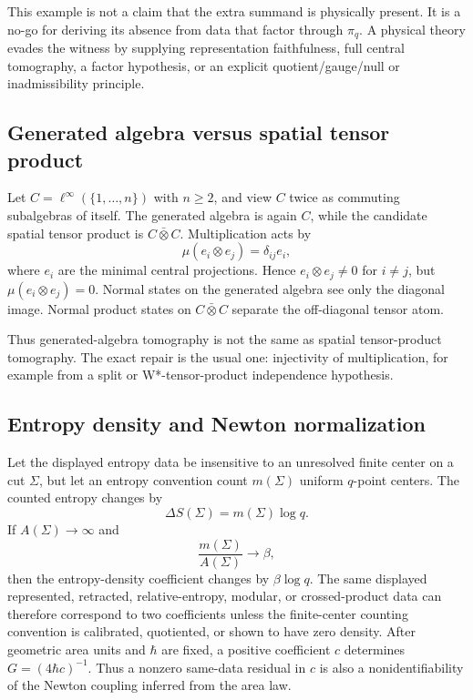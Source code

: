 \documentclass[12pt]{article}
\theoremstyle{definition}
\theoremstyle{remark}
\begin{document}
This example is not a claim that the extra summand is physically present.  It
is a no-go for deriving its absence from data that factor through \(\pi_q\).
A physical theory evades the witness by supplying representation faithfulness,
full central tomography, a factor hypothesis, or an explicit quotient/gauge/null
or inadmissibility principle.

\subsection{Generated algebra versus spatial tensor product}

Let \(C=\ell^\infty(\{1,\ldots,n\})\) with \(n\ge2\), and view \(C\) twice as
commuting subalgebras of itself.  The generated algebra is again \(C\), while
the candidate spatial tensor product is \(C\bar\otimes C\).  Multiplication
acts by
\[
  \mu(e_i\otimes e_j)=\delta_{ij}e_i,
\]
where \(e_i\) are the minimal central projections.  Hence
\(e_i\otimes e_j\ne0\) for \(i\ne j\), but \(\mu(e_i\otimes e_j)=0\).  Normal
states on the generated algebra see only the diagonal image.  Normal product
states on \(C\bar\otimes C\) separate the off-diagonal tensor atom.

Thus generated-algebra tomography is not the same as spatial tensor-product
tomography.  The exact repair is the usual one: injectivity of multiplication,
for example from a split or W*-tensor-product independence hypothesis.

\subsection{Entropy density and Newton normalization}

Let the displayed entropy data be insensitive to an unresolved finite center on
a cut \(\Sigma\), but let an entropy convention count \(m(\Sigma)\) uniform
\(q\)-point centers.  The counted entropy changes by
\[
  \Delta S(\Sigma)=m(\Sigma)\log q .
\]
If \(A(\Sigma)\to\infty\) and
\[
  \frac{m(\Sigma)}{A(\Sigma)}\longrightarrow \beta ,
\]
then the entropy-density coefficient changes by \(\beta\log q\).  The same
displayed represented, retracted, relative-entropy, modular, or crossed-product
data can therefore correspond to two coefficients unless the finite-center
counting convention is calibrated, quotiented, or shown to have zero density.
After geometric area units and \(\hbar\) are fixed, a positive coefficient
\(c\) determines \(G=(4\hbar c)^{-1}\).  Thus a nonzero same-data residual in
\(c\) is also a nonidentifiability of the Newton coupling inferred from the
area law.
\end{document}
